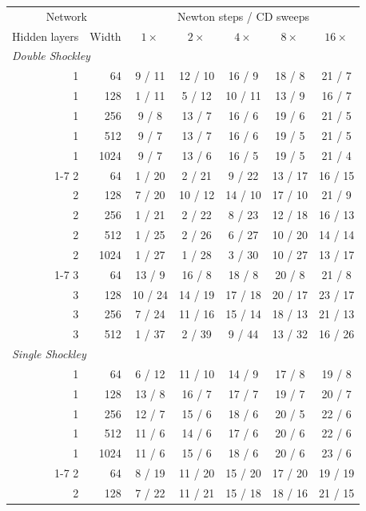 \documentclass[11pt,a4paper]{article}
\begin{document}
\begin{center}
\small
\begin{tabular}{rr|ccccc}
\multicolumn{2}{c|}{Network} & \multicolumn{5}{c}{Newton steps / CD sweeps} \\
Hidden layers & Width & $1\times$ & $2\times$ & $4\times$ & $8\times$ & $16\times$ \\
\hline
\multicolumn{7}{l}{\emph{Double Shockley}} \\
1 & 64 & 9 / 11 & 12 / 10 & 16 / 9 & 18 / 8 & 21 / 7 \\
1 & 128 & 1 / 11 & 5 / 12 & 10 / 11 & 13 / 9 & 16 / 7 \\
1 & 256 & 9 / 8 & 13 / 7 & 16 / 6 & 19 / 6 & 21 / 5 \\
1 & 512 & 9 / 7 & 13 / 7 & 16 / 6 & 19 / 5 & 21 / 5 \\
1 & 1024 & 9 / 7 & 13 / 6 & 16 / 5 & 19 / 5 & 21 / 4 \\
\cline{1-7}
2 & 64 & 1 / 20 & 2 / 21 & 9 / 22 & 13 / 17 & 16 / 15 \\
2 & 128 & 7 / 20 & 10 / 12 & 14 / 10 & 17 / 10 & 21 / 9 \\
2 & 256 & 1 / 21 & 2 / 22 & 8 / 23 & 12 / 18 & 16 / 13 \\
2 & 512 & 1 / 25 & 2 / 26 & 6 / 27 & 10 / 20 & 14 / 14 \\
2 & 1024 & 1 / 27 & 1 / 28 & 3 / 30 & 10 / 27 & 13 / 17 \\
\cline{1-7}
3 & 64 & 13 / 9 & 16 / 8 & 18 / 8 & 20 / 8 & 21 / 8 \\
3 & 128 & 10 / 24 & 14 / 19 & 17 / 18 & 20 / 17 & 23 / 17 \\
3 & 256 & 7 / 24 & 11 / 16 & 15 / 14 & 18 / 13 & 21 / 13 \\
3 & 512 & 1 / 37 & 2 / 39 & 9 / 44 & 13 / 32 & 16 / 26 \\
\hline
\multicolumn{7}{l}{\emph{Single Shockley}} \\
1 & 64 & 6 / 12 & 11 / 10 & 14 / 9 & 17 / 8 & 19 / 8 \\
1 & 128 & 13 / 8 & 16 / 7 & 17 / 7 & 19 / 7 & 20 / 7 \\
1 & 256 & 12 / 7 & 15 / 6 & 18 / 6 & 20 / 5 & 22 / 6 \\
1 & 512 & 11 / 6 & 14 / 6 & 17 / 6 & 20 / 6 & 22 / 6 \\
1 & 1024 & 11 / 6 & 15 / 6 & 18 / 6 & 20 / 6 & 23 / 6 \\
\cline{1-7}
2 & 64 & 8 / 19 & 11 / 20 & 15 / 20 & 17 / 20 & 19 / 19 \\
2 & 128 & 7 / 22 & 11 / 21 & 15 / 18 & 18 / 16 & 21 / 15 \\

\end{tabular}
\end{center}
\end{document}
